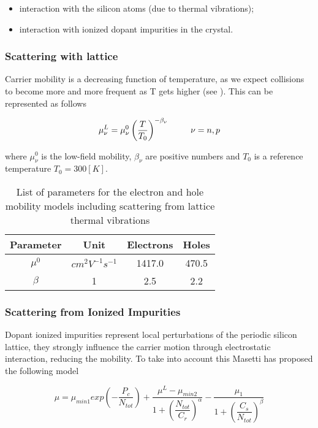 \begin{itemize}
\item interaction with the silicon atoms (due to thermal vibrations);
\item interaction with ionized dopant impurities in the crystal.
\end{itemize}

\subsubsection{Scattering with lattice}

Carrier mobility is a decreasing function of temperature, as we expect collisions to become more and more frequent as T gets higher (see \cite{Lombardi:MobConst}). This can be represented as follows

\begin{equation}
\label{eq: mobility thermal}
\mu_\nu^L = \mu_\nu^0\left( \dfrac{T}{T_0}\right)^{-\beta_\nu} \psp{15} \nu = n,p
\end{equation}

where $\mu_\nu^0$ is the low-field mobility, $\beta_\nu$ are positive numbers and $T_0$ is a reference temperature $T_0=300[K]$.

\begin{table}[!h]
\centering
\begin{tabular}{cccc}
\toprule
Parameter & Unit & Electrons & Holes \\
\midrule
$\mu^0$ & $cm^2V^{-1}s^{-1}$ & 1417.0 & 470.5\\
$\beta$ & 1 & 2.5 & 2.2\\
\bottomrule
\end{tabular}
\caption{List of parameters for the electron and hole mobility models including scattering from lattice thermal vibrations}
\end{table}

\subsubsection{Scattering from Ionized Impurities}

Dopant ionized impurities represent local perturbations of the periodic silicon lattice, they strongly influence the carrier motion through electrostatic interaction, reducing the mobility. To take into account this Masetti has proposed the following model \cite{Masetti:MobDop}


\begin{equation}
\label{eq: mobility impurities}
\mu = \mu_{min1}exp\left( 	- \dfrac{P_c}{N_{tot}}\right)
 + \dfrac{\mu^L-\mu_{min2}}{1 + \left( \dfrac{N_{tot}}{C_r} \right)^{\alpha} } 
 - \dfrac{\mu_1}{1 + \left( \dfrac{C_s}{N_{tot}} \right)^{\beta} } 
\end{equation}

